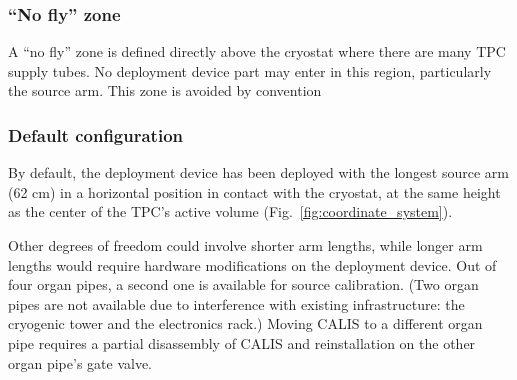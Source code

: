 \subsubsection*{``No fly'' zone}
A ``no fly'' zone is defined directly above the cryostat where there are many TPC supply tubes. No deployment device part may enter in this region, particularly the source arm. This zone is avoided by convention


\subsubsection*{Default configuration}
By default, the deployment device has been deployed with the longest source arm (62 cm) in a horizontal position in contact with the cryostat, at the same height as the center of the TPC's active volume (Fig.~\ref{fig:coordinate_system}). 

Other degrees of freedom could involve shorter arm lengths, while longer arm lengths would require hardware modifications on the deployment device. Out of four organ pipes, a second one is available for source calibration. (Two organ pipes are not available due to interference with existing infrastructure: the cryogenic tower and the electronics rack.) Moving CALIS to a different organ pipe requires a partial disassembly of CALIS and reinstallation on the other organ pipe's gate valve.

